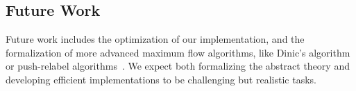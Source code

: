 \documentclass[smallcondensed]{svjour3}     %
\begin{document}
  \subsection{Future Work}
  Future work includes the optimization of our implementation, and the formalization of more advanced maximum flow algorithms, like Dinic's algorithm~\cite{Di06} or push-relabel algorithms~\cite{GoTa88}.
  We expect both formalizing the abstract theory and developing efficient implementations to be challenging but realistic tasks.
\end{document}
